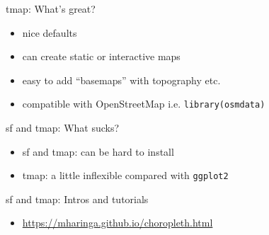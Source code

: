 \documentclass[aspectratio=169,12pt]{beamer} %
\begin{document}
\begin{frame}{tmap: What's great?}
	\begin{itemize}
		\item nice defaults
		\item can create static or interactive maps
		\item easy to add ``basemaps'' with topography etc.
		\item compatible with OpenStreetMap i.e. \texttt{library(osmdata)}
	\end{itemize}
\end{frame}

\begin{frame}{sf and tmap: What sucks?}
	\begin{itemize}
		\item sf and tmap: can be hard to install
		\item tmap: a little inflexible compared with \texttt{ggplot2}
	\end{itemize}
\end{frame}

\begin{frame}{sf and tmap: Intros and tutorials}
	\begin{itemize}
		\item \scriptsize{\url{https://mharinga.github.io/choropleth.html}}
	\end{itemize}
\end{frame}
\end{document}
